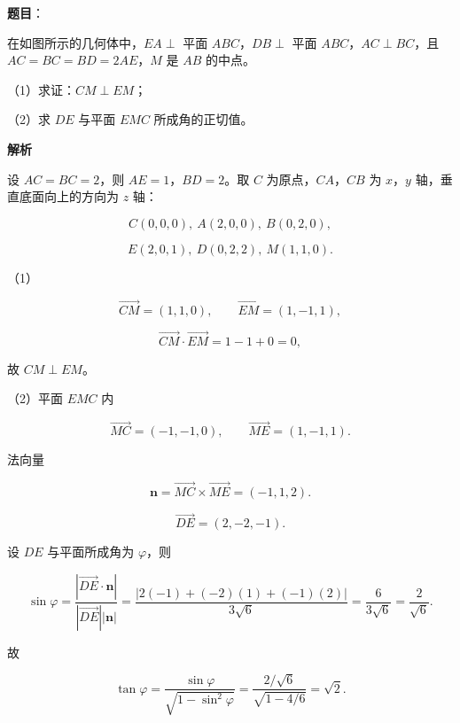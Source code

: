 \begin{answer}

\textbf{题目}：

在如图所示的几何体中，$EA\perp$ 平面 $ABC$，$DB\perp$ 平面 $ABC$，$AC\perp BC$，且 $AC=BC=BD=2AE$，$M$ 是 $AB$ 的中点。

（1）求证：$CM\perp EM$；

（2）求 $DE$ 与平面 $EMC$ 所成角的正切值。
\nopagebreak[4]
\begin{center}\end{center}
\nopagebreak[4]
\textbf{解析}

设 $AC=BC=2$，则 $AE=1$，$BD=2$。取 $C$ 为原点，$CA$，$CB$ 为 $x$，$y$ 轴，垂直底面向上的方向为 $z$ 轴：

\nopagebreak[4]
\[C(0,0,0),\ A(2,0,0),\ B(0,2,0),\]

\nopagebreak[4]
\[E(2,0,1),\ D(0,2,2),\ M(1,1,0).\]

（1）

\nopagebreak[4]
\[\overrightarrow{CM}=(1,1,0),\qquad \overrightarrow{EM}=(1,-1,1),\]

\nopagebreak[4]
\[\overrightarrow{CM}\cdot\overrightarrow{EM}=1-1+0=0,\]

故 $CM\perp EM$。

（2）平面 $EMC$ 内

\nopagebreak[4]
\[\overrightarrow{MC}=(-1,-1,0),\qquad \overrightarrow{ME}=(1,-1,1).\]

法向量

\nopagebreak[4]
\[\boldsymbol n=\overrightarrow{MC}\times\overrightarrow{ME}=(-1,1,2).\]

\nopagebreak[4]
\[\overrightarrow{DE}=(2,-2,-1).\]

设 $DE$ 与平面所成角为 $\varphi$，则

\nopagebreak[4]
\[\sin\varphi=\frac{|\overrightarrow{DE}\cdot\boldsymbol n|}{|\overrightarrow{DE}||\boldsymbol n|}
=\frac{|2(-1)+(-2)(1)+(-1)(2)|}{3\sqrt6}
=\frac{6}{3\sqrt6}=\frac2{\sqrt6}.\]

故

\nopagebreak[4]
\[\tan\varphi=\frac{\sin\varphi}{\sqrt{1-\sin^2\varphi}}
=\frac{2/\sqrt6}{\sqrt{1-4/6}}=\sqrt2.\]


\end{answer}
